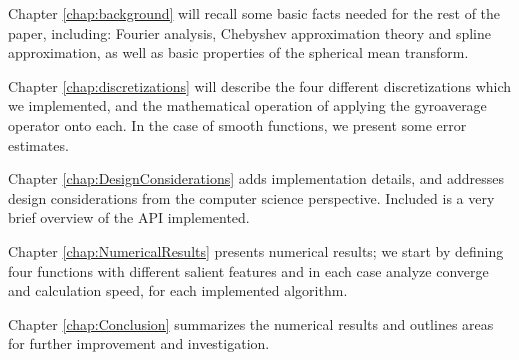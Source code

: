 Chapter \ref{chap:background} will recall some basic facts needed for the rest of the paper, including: Fourier analysis, Chebyshev approximation theory and spline approximation, as well as basic properties of the spherical mean transform.

Chapter \ref{chap:discretizations} will describe the four different discretizations which we implemented, and the mathematical operation of applying the gyroaverage operator onto each.  In the case of smooth functions, we present some error estimates.

Chapter \ref{chap:DesignConsiderations} adds implementation details, and addresses design considerations from the computer science perspective.  Included is a very brief overview of the API implemented.  

Chapter \ref{chap:NumericalResults} presents numerical results; we start by defining four functions with different salient features and in each case analyze converge and calculation speed, for each implemented algorithm.


Chapter \ref{chap:Conclusion} summarizes the numerical results and outlines areas for further improvement and investigation.

